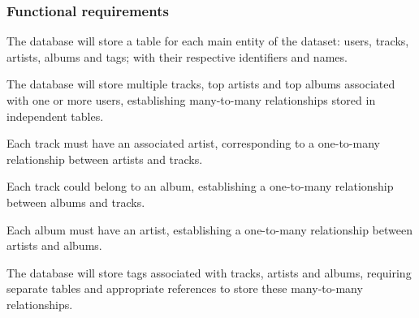 \subsubsection{Functional requirements}

\begin{functionalmod}[DB]
    \item The database will store a table for each main entity of the dataset: users, tracks, artists, albums and tags; with their respective identifiers and names.
    \item The database will store multiple tracks, top artists and top albums associated with one or more users, establishing many-to-many relationships stored in independent tables.
    \begin{functionalmod}[DB]
        \item Each track must have an associated artist, corresponding to a one-to-many relationship between artists and tracks.
        \item Each track could belong to an album, establishing a one-to-many relationship between albums and tracks. 
        \item Each album must have an artist, establishing a one-to-many relationship between artists and albums.
    \end{functionalmod}
    \item The database will store tags associated with tracks, artists and albums, requiring separate tables and appropriate references to store these many-to-many relationships.
\end{functionalmod}